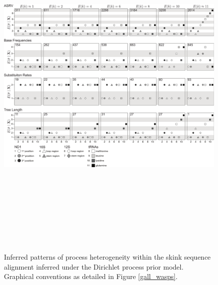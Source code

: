 \documentclass[11pt]{article}
\begin{document}
\newpage

\begin{figure}[h] 
\centering 
\includegraphics[angle=90, height=175mm]{figures/figure_3.pdf} 
\caption{Inferred patterns of process heterogeneity within the skink sequence alignment inferred under the Dirichlet process prior model.  Graphical conventions as detailed in Figure \ref{gall_wasps}.}
\label{skinks}
\end{figure} 

\newpage
\end{document}
